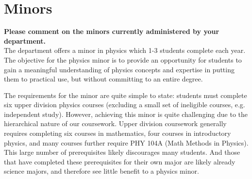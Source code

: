 \documentclass[12pt]{article}
\begin{document}
\newpage	
\section{Minors}
{\bf Please comment on the minors currently administered by your department.}\\[3pt]




\noindent
The department offers a minor in physics which 1-3 students complete each year.  The objective for the
physics minor is to provide an opportunity for students to gain a
meaningful understanding of physics concepts and expertise in putting
them to practical use, but without committing to an entire degree.

The requirements for the minor are quite simple to state: students
must complete six upper division physics courses (excluding a small
set of ineligible courses, e.g. independent study).  However,
achieving this minor is quite challenging due to the hierarchical
nature of our coursework.  Upper division coursework generally
requires completing six courses in mathematics, four courses in
introductory physics, and many courses further require PHY 104A (Math
Methods in Physics).  This large number of prerequisites likely
discourages many students.  And those that have completed these
prerequisites for their own major are likely already science majors,
and therefore see little benefit to a physics minor.
\end{document}
